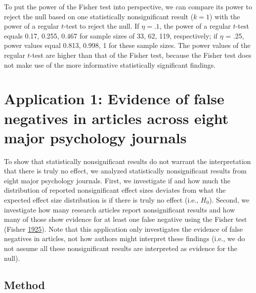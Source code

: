 \documentclass[a5paper]{book}
\begin{document}
To put the power of the Fisher test into perspective, we can compare its
power to reject the null based on one statistically nonsignificant
result (\(k=1\)) with the power of a regular \(t\)-test to reject the
null. If \(\eta=.1\), the power of a regular \(t\)-test equals 0.17,
0.255, 0.467 for sample sizes of 33, 62, 119, respectively; if \(\eta\)
= .25, power values equal 0.813, 0.998, 1 for these sample sizes. The
power values of the regular \(t\)-test are higher than that of the
Fisher test, because the Fisher test does not make use of the more
informative statistically significant findings.

\section{Application 1: Evidence of false negatives in articles across
eight major psychology
journals}\label{application-1-evidence-of-false-negatives-in-articles-across-eight-major-psychology-journals}

To show that statistically nonsignificant results do not warrant the
interpretation that there is truly no effect, we analyzed statistically
nonsignificant results from eight major psychology journals. First, we
investigate if and how much the distribution of reported nonsignificant
effect sizes deviates from what the expected effect size distribution is
if there is truly no effect (i.e., \(H_0\)). Second, we investigate how
many research articles report nonsignificant results and how many of
those show evidence for at least one false negative using the Fisher
test (Fisher \protect\hyperlink{ref-Fisher1925-jl}{1925}). Note that
this application only investigates the evidence of false negatives in
articles, not how authors might interpret these findings (i.e., we do
not assume all these nonsignificant results are interpreted as evidence
for the null).

\subsection{Method}\label{method}
\end{document}
